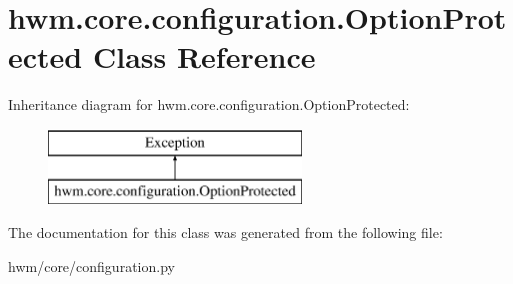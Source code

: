\hypertarget{classhwm_1_1core_1_1configuration_1_1_option_protected}{\section{hwm.\-core.\-configuration.\-Option\-Protected Class Reference}
\label{classhwm_1_1core_1_1configuration_1_1_option_protected}
}
Inheritance diagram for hwm.\-core.\-configuration.\-Option\-Protected\-:\begin{figure}[H]
\begin{center}
\leavevmode
\includegraphics[height=2.000000cm]{classhwm_1_1core_1_1configuration_1_1_option_protected}
\end{center}
\end{figure}


The documentation for this class was generated from the following file\-:\begin{DoxyCompactItemize}
\item 
hwm/core/configuration.\-py\end{DoxyCompactItemize}
